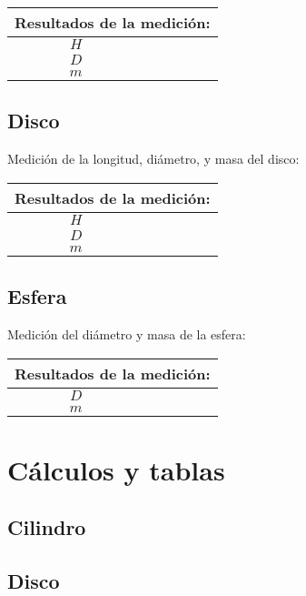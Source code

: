 \documentclass[letter,twoside,11pt]{article}
\begin{document}
\vspace{0.4cm}
\begin{tabular}{|c|p{5.0cm}|}
\hline
\multicolumn{2}{|c|}{Resultados de la medición:} \\ \hline
$H$ & \\ \hline
$D$ & \\ \hline
$m$ & \\ \hline
\end{tabular}

\subsection{Disco}
Medición de la longitud, diámetro, y masa del disco:

\vspace{0.4cm}
\begin{tabular}{|c|p{5.0cm}|}
\hline
\multicolumn{2}{|c|}{Resultados de la medición:} \\ \hline
$H$ & \\ \hline
$D$ & \\ \hline
$m$ & \\ \hline
\end{tabular}

\subsection{Esfera}
Medición del diámetro y masa de la esfera:

\vspace{0.4cm}
\begin{tabular}{|c|p{5.0cm}|}
\hline
\multicolumn{2}{|c|}{Resultados de la medición:} \\ \hline
$D$ & \\ \hline
$m$ & \\ \hline
\end{tabular}

\section{Cálculos y tablas}

\subsection{Cilindro}
\newpage

\subsection{Disco}
\vspace{6.0cm}
\end{document}
